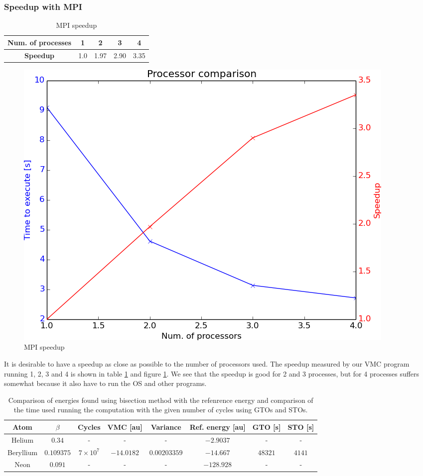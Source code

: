 	\subsubsection{Speedup with MPI}
		\begin{table}
			\center
			\begin{tabular}{| c | c| c| c| c|}
				\hline
					\textbf{Num. of processes} &	1	&	2	&	3	&	4
				\\ \hline
				\textbf{Speedup}	&	1.0	&	1.97	&	2.90	&	3.35
				\\	\hline
			\end{tabular}
			\caption{MPI speedup}
			\label{tab:MPI_speedup}
		\end{table}

		\begin{figure}
			\centering \includegraphics[width=0.45\linewidth]{../figures/processor_number_time_comparison}
			\protect\caption{MPI speedup}
			\label{fig:MPI_speedup}
		\end{figure}

		It is desirable to have a speedup as close as possible to the number of processors used. The speedup measured by our VMC program running 1, 2, 3 and 4 is shown in table \ref{tab:MPI_speedup} and figure \ref{fig:MPI_speedup}. We see that the speedup is good for 2 and 3 processes, but for 4 processes suffers somewhat because it also have to run the OS and other programs.


		\begin{table}
			\center %
			\begin{tabular}{|c|c|c|c|c|c|c|c|}
				\hline 
				Atom  & $\beta$ & Cycles & VMC {[}au{]} & Variance & Ref. energy {[}au{]} & GTO [s] & STO [s] \tabularnewline
				\hline 
				Helium &  $0.34$ & - & - & - & $-2.9037$ & - & - \tabularnewline
				\hline 
				Beryllium  &  $0.109375$ & $7\times 10^{7}$ & $-14.0182$ & $0.00203359$ & $-14.667$ & $48321$ & $4141$ \tabularnewline
				\hline 
				Neon  & $0.091$ & - & - & - & $-128.928$ & - & - \tabularnewline
				\hline 
			\end{tabular}\protect\caption{ Comparison of energies found using bisection method with the refenrence energy \parencite{Koput_2011_PCCP} \parencite{Binkley_1975} and comparison of the time used running the computation with the given number of cycles using GTOs and STOs.}
			\label{tab:AtomsGTO} 
		\end{table}
